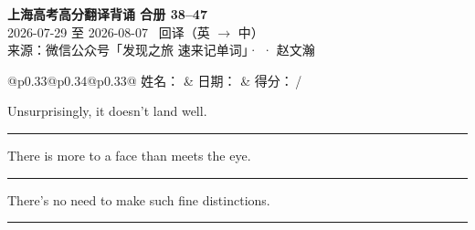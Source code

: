 \documentclass[11pt,a4paper]{article}
\newcommand{\num}[1]{\makebox[1.9em][r]{#1.}\hspace{0.3em}}
\newcommand{\wline}{\noindent\rule{\linewidth}{0.4pt}}
\begin{document}
\pagestyle{plain}
\begin{center}
{\LARGE\bfseries 上海高考高分翻译背诵 \quad 合册 38–47}\\[0.25em]
{\large 2026-07-29 至 2026-08-07 \quad\ 回译（英 $\to$ 中）}\\[0.35em]
{\footnotesize 来源：微信公众号「发现之旅 速来记单词」·  · 赵文瀚}
\end{center}

\vspace{0.4em}
\noindent\begin{tabular}{@{}p{0.33\textwidth}@{}p{0.34\textwidth}@{}p{0.33\textwidth}@{}}
姓名：\underline{\hspace{2.0cm}} & 日期：\underline{\hspace{2.0cm}} & 得分：\underline{\hspace{1.4cm}}\,/ \\
\end{tabular}

\vspace{0.5em}

\vspace{0.8em}
\vspace{0.35em}\vspace{0.15em}

\begin{minipage}{\linewidth}

\num{1}Unsurprisingly, it doesn't land well.

\vspace{0.25em}

\wline

\end{minipage}

\begin{minipage}{\linewidth}

\num{2}There is more to a face than meets the eye.

\vspace{0.25em}

\wline

\end{minipage}

\begin{minipage}{\linewidth}

\num{3}There's no need to make such fine distinctions.

\vspace{0.25em}

\wline

\end{minipage}
\end{document}
